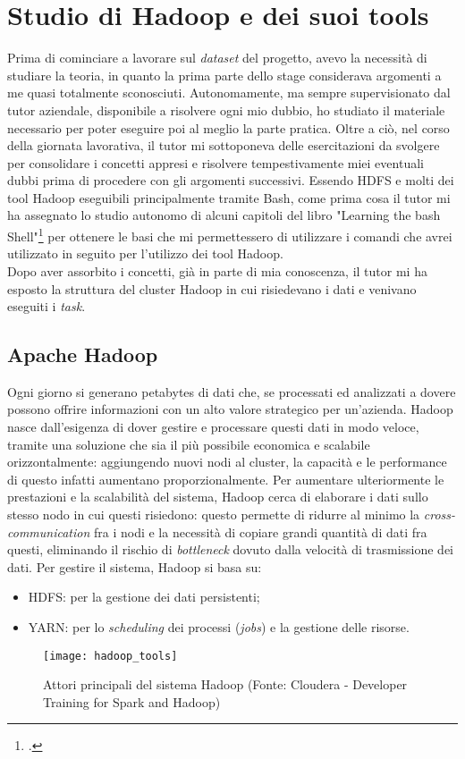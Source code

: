 
\section{Studio di Hadoop e dei suoi tools}
Prima di cominciare a lavorare sul \textit{dataset} del progetto, avevo la necessità di studiare la teoria, in quanto la prima parte dello stage considerava argomenti a me quasi totalmente sconosciuti.
Autonomamente, ma sempre supervisionato dal tutor aziendale, disponibile a risolvere ogni mio dubbio, ho studiato il materiale necessario per poter eseguire poi al meglio la parte pratica. Oltre a ciò, nel corso della giornata lavorativa, il tutor mi sottoponeva delle esercitazioni da svolgere per consolidare i concetti appresi e risolvere tempestivamente miei eventuali dubbi prima di procedere con gli argomenti successivi.
Essendo \gls{HDFS} e molti dei tool Hadoop eseguibili principalmente tramite \gls{Bash}, come prima cosa il tutor mi ha assegnato lo studio autonomo di alcuni capitoli del libro "Learning the bash Shell"\footcite{http://shop.oreilly.com/product/9780596009656.do} per ottenere le basi che mi permettessero di utilizzare i comandi che avrei utilizzato in seguito per l'utilizzo dei tool Hadoop.\\
Dopo aver assorbito i concetti, già in parte di mia conoscenza, il tutor mi ha esposto la struttura del \gls{cluster} Hadoop in cui risiedevano i dati e venivano eseguiti i \textit{task}. 

\subsection{Apache Hadoop}
Ogni giorno si generano petabytes di dati che, se processati ed analizzati a dovere possono offrire informazioni con un alto valore strategico per un'azienda. Hadoop nasce dall'esigenza di dover gestire e processare questi dati in modo veloce, tramite una soluzione che sia il più possibile economica e scalabile orizzontalmente: aggiungendo nuovi nodi al \gls{cluster}, la capacità e le performance di questo infatti aumentano proporzionalmente. Per aumentare ulteriormente le prestazioni e la scalabilità del sistema, Hadoop cerca di elaborare i dati sullo stesso nodo in cui questi risiedono: questo permette di ridurre al minimo la \textit{cross-communication} fra i nodi e la necessità di copiare grandi quantità di dati fra questi, eliminando il rischio di \textit{bottleneck} dovuto dalla velocità di trasmissione dei dati. Per gestire il sistema, Hadoop si basa su:
\begin{itemize}
	\item \gls{HDFS}: per la gestione dei dati persistenti;
	\item YARN: per lo \textit{scheduling} dei processi (\textit{jobs}) e la gestione delle risorse.
\end{itemize}
\begin{figure}[!h]
	\centering 
	\texttt{[image: hadoop\_tools]}
	\caption{Attori principali del sistema Hadoop (Fonte: Cloudera - Developer Training for Spark and Hadoop)}
\end{figure}

